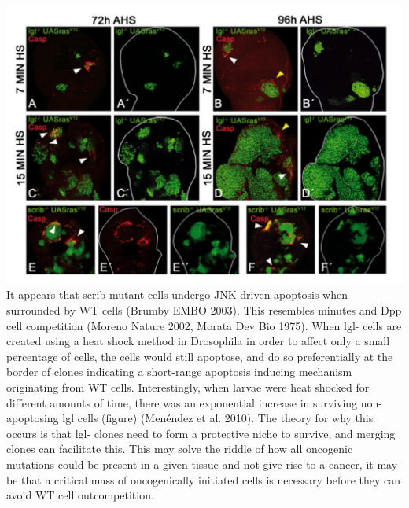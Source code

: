 \documentclass[]{book}
\newenvironment{Shaded}{\begin{snugshade}}{\end{snugshade}}
\newcommand{\KeywordTok}[1]{\textcolor[rgb]{0.13,0.29,0.53}{\textbf{#1}}}
\newcommand{\DataTypeTok}[1]{\textcolor[rgb]{0.13,0.29,0.53}{#1}}
\newcommand{\DecValTok}[1]{\textcolor[rgb]{0.00,0.00,0.81}{#1}}
\newcommand{\StringTok}[1]{\textcolor[rgb]{0.31,0.60,0.02}{#1}}
\newcommand{\OtherTok}[1]{\textcolor[rgb]{0.56,0.35,0.01}{#1}}
\newcommand{\OperatorTok}[1]{\textcolor[rgb]{0.81,0.36,0.00}{\textbf{#1}}}
\newcommand{\NormalTok}[1]{#1}
\begin{document}
\begin{Shaded}
\end{Shaded}

\includegraphics{images/04-3.jpg} It appears that scrib mutant cells
undergo JNK-driven apoptosis when surrounded by WT cells (Brumby EMBO
2003). This resembles minutes and Dpp cell competition (Moreno Nature
2002, Morata Dev Bio 1975). When lgl- cells are created using a heat
shock method in Drosophila in order to affect only a small percentage of
cells, the cells would still apoptose, and do so preferentially at the
border of clones indicating a short-range apoptosis inducing mechanism
originating from WT cells. Interestingly, when larvae were heat shocked
for different amounts of time, there was an exponential increase in
surviving non-apoptosing lgl cells (figure) (Menéndez et al. 2010). The
theory for why this occurs is that lgl- clones need to form a protective
niche to survive, and merging clones can facilitate this. This may solve
the riddle of how all oncogenic mutations could be present in a given
tissue and not give rise to a cancer, it may be that a critical mass of
oncogenically initiated cells is necessary before they can avoid WT cell
outcompetition.
\end{document}
